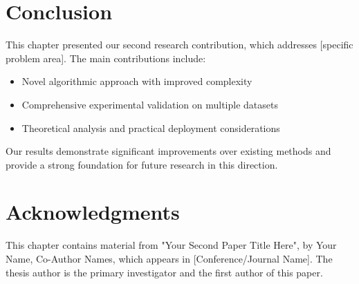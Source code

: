 \section{Conclusion}

This chapter presented our second research contribution, which addresses [specific problem area]. The main contributions include:
\begin{itemize}
    \item Novel algorithmic approach with improved complexity
    \item Comprehensive experimental validation on multiple datasets
    \item Theoretical analysis and practical deployment considerations
\end{itemize}

Our results demonstrate significant improvements over existing methods and provide a strong foundation for future research in this direction.

\section*{Acknowledgments}
This chapter contains material from "Your Second Paper Title Here", by Your Name, Co-Author Names, which appears in [Conference/Journal Name]. The thesis author is the primary investigator and the first author of this paper. 